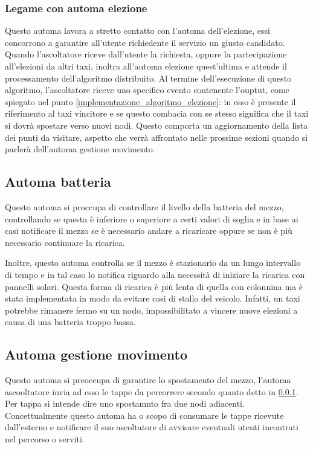 \subsubsection{Legame con automa elezione} \label{listenerElection}
Questo automa lavora a stretto contatto con l'automa dell'elezione, essi concorrono a garantire all'utente richiedente il servizio un giusto candidato. Quando l'ascoltatore riceve dall'utente la richiesta, oppure la partecipazione all'elezioni da altri taxi, inoltra all'automa elezione quest'ultima e attende il processamento dell'algoritmo distribuito. Al termine dell'esecuzione di questo algoritmo, l'ascoltatore riceve uno specifico evento contenente l'ouptut, come spiegato nel punto \ref{implementazione_algoritmo_elezione}: in esso è presente il riferimento al taxi vincitore e se questo combacia con se stesso significa che il taxi si dovrà spostare verso nuovi nodi. Questo comporta un aggiornamento della lista dei punti da visitare, aspetto che verrà affrontato nelle prossime sezioni quando si parlerà dell'automa gestione movimento.

\subsection{Automa batteria} \label{automaBatteria}
Questo automa si proccupa di controllare il livello della batteria del mezzo, controllando se questa è inferiore o superiore a certi valori di soglia e in base ai casi notificare il mezzo se è necessario andare a ricaricare oppure se non è più necessario continuare la ricarica.

Inoltre, questo automa controlla se il mezzo è stazionario da un lungo intervallo di tempo e in tal caso lo notifica riguardo alla necessità di iniziare la ricarica con pannelli solari. Questa forma di ricarica è più lenta di quella con colonnina ma è stata implementata in modo da evitare casi di stallo del veicolo. Infatti, un taxi potrebbe rimanere fermo su un nodo, impossibilitato a vincere nuove elezioni a causa di una batteria troppo bassa. 

\subsection{Automa gestione movimento} \label{automaMoving}

Questo automa si preoccupa di garantire lo spostamento del mezzo, l'automa ascooltatore invia ad esso le tappe da percorrere secondo quanto detto in \ref{listenerElection}.
Per tappa si intende dire uno spostamnto fra due nodi adiacenti. Concettualmente questo automa ha o scopo di consumare le tappe ricevute dall'esterno e notificare il suo ascoltatore di avvisare eventuali utenti incontrati nel percorso o serviti. 

